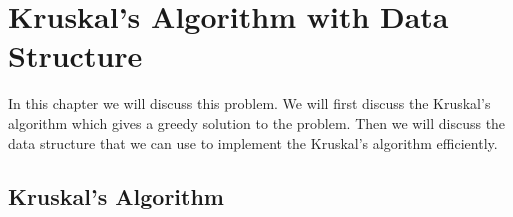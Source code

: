 \chapter{Kruskal's Algorithm with Data Structure}
\begin{algoprob}
\end{algoprob}
In this chapter we will discuss this problem. We will first discuss the Kruskal's algorithm which gives a greedy solution to the problem. Then we will discuss the data structure that we can use to implement the Kruskal's algorithm efficiently.
\section{Kruskal's Algorithm}

